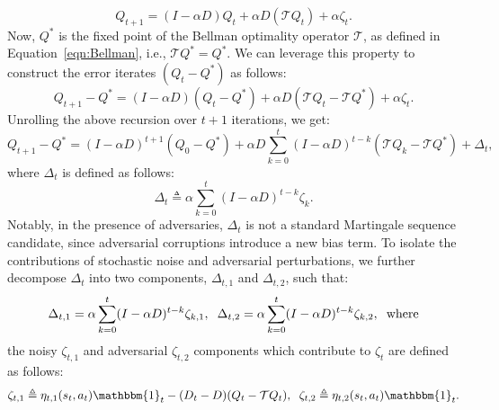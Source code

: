 \documentclass{article}
\newcommand{\mc}{\mathcal}
\begin{document}
\begin{equation}\label{eqn:pre-final}
    Q_{t+1} = (I - \alpha D) Q_t + \alpha D (\mathcal{T}Q_t) + \alpha \zeta_t.
\end{equation}
Now, \(Q^{*}\) is the fixed point of the Bellman optimality operator \(\mathcal{T}\), as defined in Equation~\eqref{eqn:Bellman}, i.e., \(\mathcal{T}Q^* = Q^*\). We can leverage this property to construct the error iterates \( (Q_t -Q^*)\) as follows:
\begin{equation}\label{eqn:final_before-recursion}
 Q_{t+1} - Q^* = (I - \alpha D) (Q_t - Q^*) + \alpha D (\mathcal{T}Q_t - \mc{T}Q^*) + \alpha \zeta_t.
\end{equation}
Unrolling the above recursion over \(t+1\) iterations, we get: 
\begin{equation}\label{eqn:adversarial_final_recursion}
 Q_{t+1} - Q^* = (I - \alpha D)^{t+1} (Q_0 - Q^*) + \alpha D \sum_{k=0}^{t} (I - \alpha D)^{t-k} (\mathcal{T} Q_k - \mathcal{T} Q^*) + \Delta_t,
\end{equation}
where $\Delta_t$ is defined as follows:
\begin{equation}
    \Delta_t \triangleq \alpha \sum_{k=0}^{t} (I - \alpha D)^{t-k} \zeta_k.
\end{equation}
 Notably, in the presence of adversaries, $\Delta_t$ is not a standard Martingale sequence candidate, since adversarial corruptions introduce a new bias term. To isolate the contributions of stochastic noise and adversarial perturbations, we further decompose $\Delta_t$ into two components, $\Delta_{t,1}$ and $\Delta_{t,2}$, such that:
\begin{equation}\label{eqn:drift_params_final}
    \Delta_{t,1} = \alpha \sum_{k=0}^{t} (I - \alpha D)^{t-k} \zeta_{k,1} ,\hspace{2mm} \Delta_{t,2} = \alpha \sum_{k=0}^{t} (I - \alpha D)^{t-k} \zeta_{k,2}, \hspace{2mm} \textrm{where}
\end{equation}
the noisy $\zeta_{t,1}$ and adversarial $\zeta_{t,2}$ components which contribute to \(\zeta_t\) are defined as follows:
\begin{equation}
\begin{aligned}\label{eqn:drift_params}
    \zeta_{t,1} \triangleq \eta_{t,1}(s_t, a_t) \mathbbm{1}_t - (D_t - D)(Q_t - \mathcal{T}Q_t), \hspace{2mm} \zeta_{t,2} \triangleq \eta_{t,2}(s_t, a_t) \mathbbm{1}_t.
\end{aligned}
\end{equation}
\end{document}
